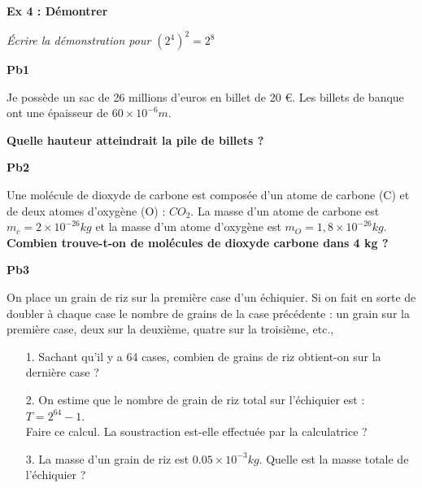\begin{multicols}{2}

\textbf{Ex 4 : Démontrer}

\textit{Écrire la démonstration pour $(2^4)^2 = 2^{8}$} \\
\Pointilles[3]

\textbf{Pb1}

Je possède un sac de 26 millions d’euros en billet de 20 \euro{}. Les billets de banque ont une épaisseur de $60 \times 10^{-6} m$.

\textbf{Quelle hauteur atteindrait la pile de billets ?} \columnbreak

\textbf{Pb2} 

Une molécule de dioxyde de carbone est composée d'un atome de carbone (C) et de deux atomes d'oxygène (O) : $CO_2$. La masse d'un atome de carbone est $ m_c = 2 \times 10^{-26}kg$ et la masse d'un atome d'oxygène est $ m_O = 1,8 \times 10^{-26}kg$. \\

\textbf{Combien trouve-t-on de molécules de dioxyde carbone dans 4 kg ?}

\end{multicols}

\Pointilles[6]

\textbf{Pb3}

\og On place un grain de riz sur la première case d'un échiquier. Si on fait en sorte de doubler à chaque case le nombre de grains de la case précédente : un grain sur la première case, deux sur la deuxième, quatre sur la troisième, etc.,

\begin{itemize}
    \item[1.] Sachant qu'il y a 64 cases, combien de grains de riz obtient-on sur la dernière case ? 
    \item[2.] On estime que le nombre de grain de riz total sur l'échiquier est : $T = 2^{64} - 1$. \\
    Faire ce calcul. La soustraction est-elle effectuée par la calculatrice ?
    \item[3.] La masse d'un grain de riz est $0.05 \times 10^{-3} kg$. Quelle est la masse totale de l'échiquier ? 
\end{itemize}

\Pointilles[6]



